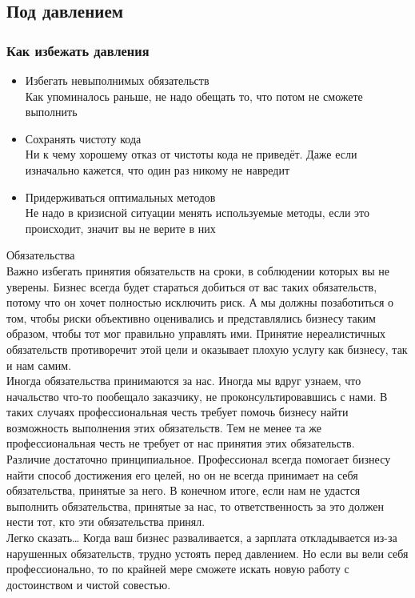 \documentclass{../industrial-development}
\begin{document}
\subsection{Под давлением}
\begin{frame} \frametitle{Как избежать давления}
\begin{itemize}
  \item Избегать невыполнимых обязательств\\
	Как упоминалось раньше, не надо обещать то, что потом не сможете выполнить
  \item Сохранять чистоту кода\\
	Ни к чему хорошему отказ от чистоты кода не приведёт. Даже если изначально кажется, что один раз никому не навредит
	\item Придерживаться оптимальных методов\\
	Не надо в кризисной ситуации менять используемые методы, если это происходит, значит вы не верите в них
\end{itemize}
\end{frame}
\lecturenotes
Обязательства\\
Важно избегать принятия обязательств на сроки, в соблюдении которых вы не уверены. Бизнес всегда будет стараться добиться от вас таких обязательств, потому что он хочет полностью исключить риск. А мы должны позаботиться о том, чтобы риски объективно оценивались и  представлялись бизнесу таким образом, чтобы тот мог правильно управлять ими. Принятие нереалистичных обязательств противоречит этой цели и оказывает плохую услугу как бизнесу, так и нам самим.\\
Иногда обязательства принимаются за нас. Иногда мы вдруг узнаем, что начальство что-то пообещало заказчику, не проконсультировавшись с нами. В таких случаях профессиональная честь требует помочь бизнесу найти возможность выполнения этих обязательств. Тем не менее та же профессиональная честь не требует от нас принятия этих обязательств.\\
Различие достаточно принципиальное. Профессионал всегда помогает бизнесу найти способ достижения его целей, но он не всегда принимает на себя обязательства, принятые за него. В конечном итоге, если нам не удастся выполнить обязательства, принятые за нас, то ответственность за это должен нести тот, кто эти обязательства принял.\\
Легко сказать… Когда ваш бизнес разваливается, а зарплата откладывается из-за нарушенных обязательств, трудно устоять перед давлением. Но если вы вели себя профессионально, то по крайней мере сможете искать новую работу с достоинством и чистой совестью.\\
\end{document}
